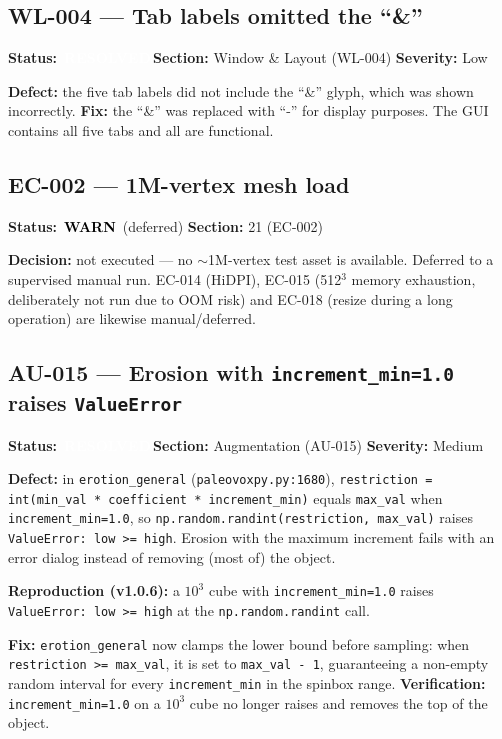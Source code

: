 \documentclass[12pt,a4paper]{article}
\newcommand{\statuswarn}{\colorbox{statusyellow}{\textcolor{black}{\textbf{\,WARN\,}}}}
\newcommand{\statusresolved}{\colorbox{statusorange}{\textcolor{white}{\textbf{\,RESOLVED\,}}}}
\begin{document}
\subsection{WL-004 --- Tab labels omitted the ``\&''}
\textbf{Status:} \statusresolved \quad \textbf{Section:} Window \& Layout
(WL-004) \quad \textbf{Severity:} Low

\textbf{Defect:} the five tab labels did not include the ``\&'' glyph, which was
shown incorrectly. \textbf{Fix:} the ``\&'' was replaced with ``-'' for display
purposes. The GUI contains all five tabs and all are functional.

\subsection{EC-002 --- 1M-vertex mesh load}
\textbf{Status:} \statuswarn{} (deferred) \quad \textbf{Section:} 21 (EC-002)

\textbf{Decision:} not executed --- no $\sim$1M-vertex test asset is available.
Deferred to a supervised manual run. EC-014 (HiDPI), EC-015 (512$^3$ memory
exhaustion, deliberately not run due to OOM risk) and EC-018 (resize during a
long operation) are likewise manual/deferred.

\subsection{AU-015 --- Erosion with \texttt{increment\_min=1.0} raises \texttt{ValueError}}
\textbf{Status:} \statusresolved \quad \textbf{Section:}
Augmentation (AU-015) \quad \textbf{Severity:} Medium

\textbf{Defect:} in \texttt{erotion\_general} (\texttt{paleovoxpy.py:1680}),
\texttt{restriction = int(min\_val * coefficient * increment\_min)} equals
\texttt{max\_val} when \texttt{increment\_min=1.0}, so
\texttt{np.random.randint(restriction, max\_val)} raises
\texttt{ValueError: low >= high}. Erosion with the maximum increment fails with
an error dialog instead of removing (most of) the object.

\textbf{Reproduction (v1.0.6):} a $10^3$ cube with \texttt{increment\_min=1.0}
raises \texttt{ValueError: low >= high} at the \texttt{np.random.randint} call.

\textbf{Fix:} \texttt{erotion\_general} now clamps the lower bound before
sampling: when \texttt{restriction >= max\_val}, it is set to
\texttt{max\_val - 1}, guaranteeing a non-empty random interval for every
\texttt{increment\_min} in the spinbox range. \textbf{Verification:}
\texttt{increment\_min=1.0} on a $10^3$ cube no longer raises and removes the
top of the object.
\end{document}
